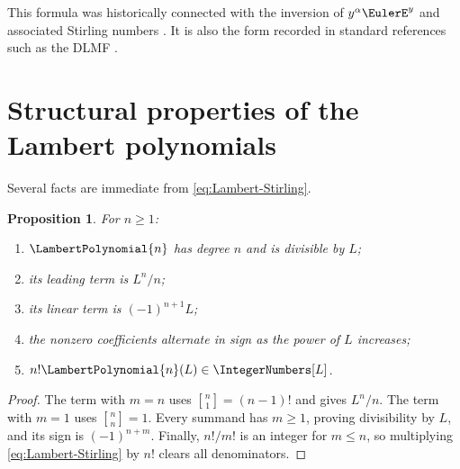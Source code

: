 \documentclass[11pt,openany]{book}
\theoremstyle{definition}
\theoremstyle{plain}
\newtheorem{proposition}{Proposition}[chapter]
\theoremstyle{remark}
\newcommand{\stirlingone}[2]{\genfrac{[}{]}{0pt}{}{#1}{#2}}
\begin{document}
This formula was historically connected with the inversion of
\(y^\alpha\EulerE^y\) and associated Stirling numbers
\cite{jeffrey-inversion,corless-lambert}.  It is also the form recorded in
standard references such as the DLMF \cite{dlmf-lambert}.

\section{Structural properties of the Lambert polynomials}
Several facts are immediate from \cref{eq:Lambert-Stirling}.

\begin{proposition}\label{prop:Pn-properties}
For \(n\ge1\):
\begin{enumerate}
\item \(\LambertPolynomial{n}\) has degree \(n\) and is divisible by \(L\);
\item its leading term is \(L^n/n\);
\item its linear term is \((-1)^{n+1}L\);
\item the nonzero coefficients alternate in sign as the power of \(L\)
      increases;
\item \(n!\LambertPolynomial{n}(L)\in\IntegerNumbers[L]\).
\end{enumerate}
\end{proposition}
\begin{proof}
The term with \(m=n\) uses
\(\stirlingone{n}{1}=(n-1)!\) and gives \(L^n/n\).  The term with \(m=1\)
uses \(\stirlingone{n}{n}=1\).  Every summand has \(m\ge1\), proving
divisibility by \(L\), and its sign is \((-1)^{n+m}\).  Finally,
\(n!/m!\) is an integer for \(m\le n\), so multiplying
\cref{eq:Lambert-Stirling} by \(n!\) clears all denominators.
\end{proof}
\end{document}
